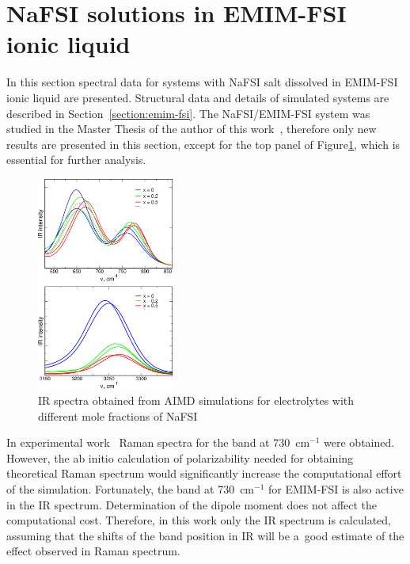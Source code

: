 \section{NaFSI solutions in EMIM-FSI ionic liquid}
\label{section:emim-fsi-ir}

In this section spectral data for systems with NaFSI salt dissolved in EMIM-FSI ionic liquid are presented. Structural data and details of simulated systems are described in Section~\ref{section:emim-fsi}. The NaFSI/EMIM-FSI system was studied in the Master Thesis of the author of this work~\cite{msc-thesis}, therefore only new results are presented in this section, except for the top panel of Figure\ref{fig:emim-fsi-spectra-aimd}, which is essential for further analysis.

\begin{figure}[ht]
    \centering
    \includegraphics[width=0.4\textwidth]{img/4-ir-spectra-from-aimd-simulations/1-emim-fsi/spectra-aimd.png}
    \caption{IR spectra obtained from AIMD simulations for electrolytes with different mole fractions of NaFSI}
    \label{fig:emim-fsi-spectra-aimd}
\end{figure}

In experimental work~\cite{na-il-1} Raman spectra for the band at 730~cm$^{-1}$ were obtained. However, the ab initio calculation of polarizability needed for obtaining theoretical Raman spectrum would significantly increase the computational effort of the simulation. Fortunately, the band at 730~cm$^{-1}$ for EMIM-FSI is also active in the IR spectrum. Determination of the dipole moment does not affect the computational cost. Therefore, in this work only the IR spectrum is calculated, assuming that the shifts of the band position in IR will be a~good estimate of the effect observed in Raman spectrum.

